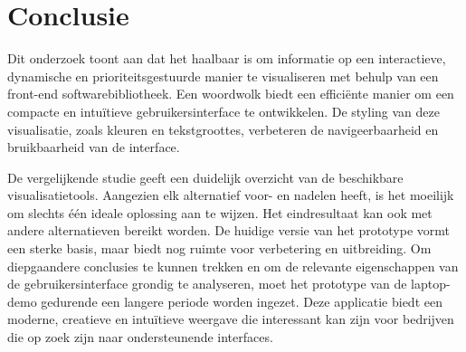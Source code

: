 
\chapter{Conclusie}%
\label{ch:conclusie}


Dit onderzoek toont aan dat het haalbaar is om informatie op een interactieve, dynamische en prioriteitsgestuurde manier te visualiseren met behulp van een front-end softwarebibliotheek. Een woordwolk biedt een efficiënte manier om een compacte en intuïtieve gebruikersinterface te ontwikkelen. De styling van deze visualisatie, zoals kleuren en tekstgroottes, verbeteren de navigeerbaarheid en bruikbaarheid van de interface.\medskip\par De vergelijkende studie geeft een duidelijk overzicht van de beschikbare visualisatietools. Aangezien elk alternatief voor- en nadelen heeft, is het moeilijk om slechts één ideale oplossing aan te wijzen. Het eindresultaat kan ook met andere alternatieven bereikt worden.
De huidige versie van het prototype vormt een sterke basis, maar biedt nog ruimte voor verbetering en uitbreiding. Om diepgaandere conclusies te kunnen trekken en om de relevante eigenschappen van de gebruikersinterface grondig te analyseren, moet het prototype van de laptop-demo gedurende een langere periode worden ingezet. Deze applicatie biedt een moderne, creatieve en intuïtieve weergave die interessant kan zijn voor bedrijven die op zoek zijn naar ondersteunende interfaces.